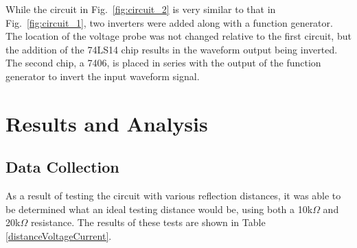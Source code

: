 \documentclass[conference]{IEEEtran}
\begin{document}
While the circuit in Fig.~\ref{fig:circuit_2} is very similar to that in Fig.~\ref{fig:circuit_1}, two inverters were added along
with a function generator. The location of the voltage probe was not changed relative to the first circuit, but the addition of the
74LS14 chip results in the waveform output being inverted. The second chip, a 7406, is placed in series with the output of the function
generator to invert the input waveform signal.

\section{Results and Analysis}

\subsection{Data Collection}

As a result of testing the circuit with various reflection distances, it was able to be
determined what an ideal testing distance would be, using both a 10k$\Omega$ and 20k$\Omega$ resistance. 
The results of these tests are shown in Table \ref{distanceVoltageCurrent}.
\end{document}
